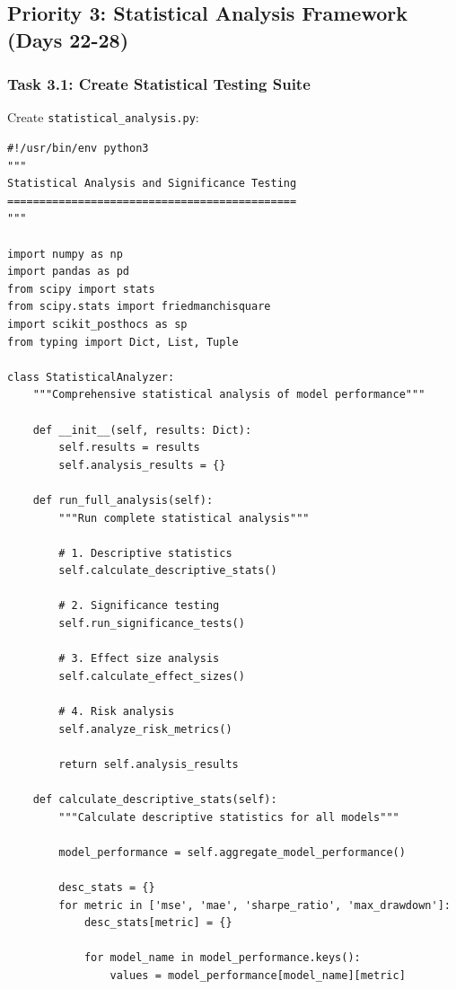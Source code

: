 \documentclass[11pt]{article}
\begin{document}
\subsection{Priority 3: Statistical Analysis Framework (Days 22-28)}

\subsubsection{Task 3.1: Create Statistical Testing Suite}

Create \texttt{statistical\_analysis.py}:

\begin{lstlisting}[style=pythonstyle, caption=Statistical Analysis Framework]
#!/usr/bin/env python3
"""
Statistical Analysis and Significance Testing
=============================================
"""

import numpy as np
import pandas as pd
from scipy import stats
from scipy.stats import friedmanchisquare
import scikit_posthocs as sp
from typing import Dict, List, Tuple

class StatisticalAnalyzer:
    """Comprehensive statistical analysis of model performance"""
    
    def __init__(self, results: Dict):
        self.results = results
        self.analysis_results = {}
        
    def run_full_analysis(self):
        """Run complete statistical analysis"""
        
        # 1. Descriptive statistics
        self.calculate_descriptive_stats()
        
        # 2. Significance testing
        self.run_significance_tests()
        
        # 3. Effect size analysis
        self.calculate_effect_sizes()
        
        # 4. Risk analysis
        self.analyze_risk_metrics()
        
        return self.analysis_results
        
    def calculate_descriptive_stats(self):
        """Calculate descriptive statistics for all models"""
        
        model_performance = self.aggregate_model_performance()
        
        desc_stats = {}
        for metric in ['mse', 'mae', 'sharpe_ratio', 'max_drawdown']:
            desc_stats[metric] = {}
            
            for model_name in model_performance.keys():
                values = model_performance[model_name][metric]
                

\end{lstlisting}
\end{document}
